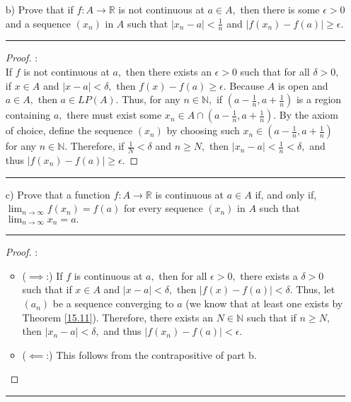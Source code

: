 \documentclass[openany, amssymb, psamsfonts]{amsart}
\newcommand{\bbN}{\mathbb{N}}
\newcommand{\bbR}{\mathbb{R}}
\theoremstyle{definition}
\numberwithin{equation}{section}
\begin{document}
\begin{enumerate}
\begin{enumerate}
\item[b)] Prove that if $f\colon A\longrightarrow \bbR$ is not continuous at $a\in A,$ then there is some $\epsilon>0$ and a sequence $(x_n)$ in $A$ such that 
$|x_n-a|<\frac{1}{n}$ and $|f(x_n)-f(a)|\geq \epsilon.$
\vspace{4pt}     \hrule   \vspace{4pt}\begin{proof}:\\
    If $f$ is not continuous at $a,$ then there exists an $\epsilon>0$ such that for all $\delta>0,$ if $x\in A$ and $|x-a|< \delta,$ then $f(x) - f(a)\geq \epsilon.$ Because $A$ is open and $a \in A,$ then $a\in LP(A).$ Thus, for any $n\in \bbN,$ if $(a-\frac{1}{n}, a + \frac{1}{n})$ is a region containing $a,$ there must exist some $x_n \in A \cap (a-\frac{1}{n}, a+ \frac{1}{n}).$ By the axiom of choice, define the sequence $(x_n)$ by choosing such $x_n \in (a-\frac{1}{n}, a+ \frac{1}{n})$ for any $n \in \bbN.$ Therefore, if $\frac{1}{N}< \delta$ and $n\geq N,$ then $|x_n - a|< \frac{1}{n}< \delta,$ and thus $|f(x_n) - f(a)|\geq \epsilon.$
\end{proof}\vspace{4pt}     \hrule   \vspace{4pt}

\item[c)]
Prove that a function $f\colon A\longrightarrow \bbR$ is continuous  at $a\in A$ if, and only if, $\displaystyle \lim_{n\longrightarrow \infty}f(x_n)=f(a)$ for every sequence $(x_n)$ in $A$ such that
$\displaystyle \lim_{n\longrightarrow \infty} x_n=a.$
\vspace{4pt}     \hrule   \vspace{4pt} \begin{proof}:\\
    \begin{itemize}
        \item ($\implies$:) If $f$ is continuous at $a,$ then for all $\epsilon>0,$ there exists a $\delta>0$ such that if $x\in A$ and $|x-a|<\delta,$ then $|f(x) - f(a)|< \delta.$ Thus, let $(a_n)$ be a sequence converging to $a$ (we know that at least one exists by Theorem \ref{15.11}). Therefore, there exists an $N \in \bbN$ such that if $n\geq N,$ then $|x_n - a|< \delta,$ and thus $|f(x_n) - f(a)|< \epsilon.$ 
        \item ($\impliedby$:) This follows from the contrapositive of part b.
    \end{itemize}
\end{proof}\vspace{4pt}     \hrule   \vspace{4pt}


\end{enumerate}
\end{enumerate}
\end{document}
